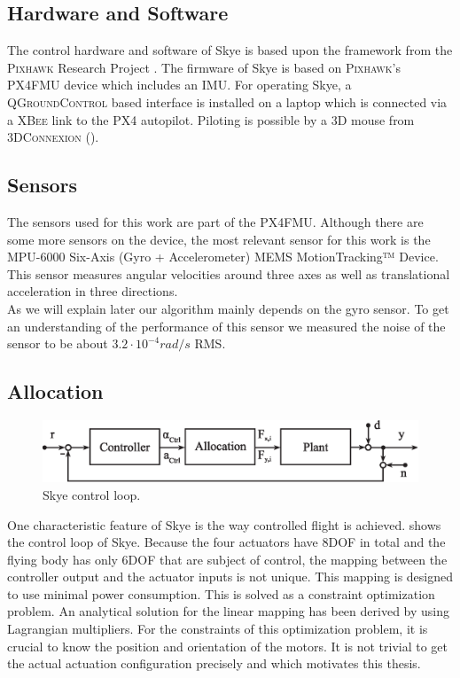 \subsection{Hardware and Software}
The control hardware and software of Skye is based upon the framework from the \textsc{Pixhawk} Research Project \citep{pixhawk}.
The firmware of Skye is based on \textsc{Pixhawk}'s PX4FMU device which includes an IMU.
For operating Skye, a \textsc{QGroundControl} based interface is installed on a laptop
which is connected via a \textsc{XBee} link to the PX4 autopilot.
Piloting is possible by a 3D mouse from \textsc{3DConnexion} (\citep[see]{Krebs2012}).

\subsection{Sensors}
The sensors used for this work are part of the PX4FMU.
Although there are some more sensors on the device, the most relevant sensor for this work is the MPU-6000 Six-Axis (Gyro + Accelerometer) MEMS MotionTracking™ Device.
This sensor measures angular velocities around three axes as well as translational acceleration in three directions. \\
As we will explain later our algorithm mainly depends on the gyro sensor.
To get an understanding of the performance of this sensor we measured the noise of the sensor to be about $3.2 \cdot 10^{-4}rad/s$ RMS.

\subsection{Allocation}

\begin{figure}[hbtp]
\centering
\includegraphics[width=.9\linewidth]{images/system_loop_3.eps}
\caption{Skye control loop.}
\label{fig:system_loop_3}
\end{figure}

One characteristic feature of Skye is the way controlled flight is achieved. 
 shows the control loop of Skye.
Because the four actuators have 8DOF in total and the flying body has only 6DOF that are subject of control,
the mapping between the controller output and the actuator inputs is not unique.
This mapping is designed to use minimal power consumption.
This is solved as a constraint optimization problem.
An analytical solution for the linear mapping has been derived by \citet{Schaffner2012} using Lagrangian multipliers.
For the constraints of this optimization problem, it is crucial to know the position and orientation of the motors.
It is not trivial to get the actual actuation configuration precisely and which motivates this thesis.






